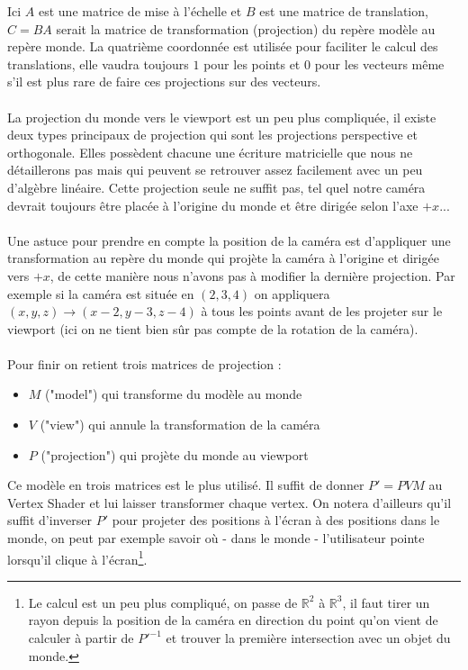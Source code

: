 \documentclass{EPUProjetDi}
\begin{document}
Ici $A$ est une matrice de mise à l'échelle et $B$ est une matrice de translation, $C=BA$ serait la matrice de transformation (projection) du repère modèle au repère monde. La quatrième coordonnée est utilisée pour faciliter le calcul des translations, elle vaudra toujours $1$ pour les points et $0$ pour les vecteurs même s'il est plus rare de faire ces projections sur des vecteurs.


\paragraph{}
La projection du monde vers le viewport est un peu plus compliquée, il existe deux types principaux de projection qui sont les projections perspective et orthogonale. Elles possèdent chacune une écriture matricielle que nous ne détaillerons pas mais qui peuvent se retrouver assez facilement avec un peu d'algèbre linéaire. Cette projection seule ne suffit pas, tel quel notre caméra devrait toujours être placée à l'origine du monde et être dirigée selon l'axe $+x$...
\par


\paragraph{}
Une astuce pour prendre en compte la position de la caméra est d'appliquer une transformation au repère du monde qui projète la caméra à l'origine et dirigée vers $+x$, de cette manière nous n'avons pas à modifier la dernière projection. Par exemple si la caméra est située en $(2,3,4)$ on appliquera $(x,y,z)\rightarrow(x-2,y-3,z-4)$ à tous les points avant de les projeter sur le viewport (ici on ne tient bien sûr pas compte de la rotation de la caméra).

\paragraph{}
Pour finir on retient trois matrices de projection :
\begin{itemize}
	\item{$M$ ("model") qui transforme du modèle au monde}
	\item{$V$ ("view") qui annule la transformation de la caméra}
	\item{$P$ ("projection") qui projète du monde au viewport}
\end{itemize}

Ce modèle en trois matrices est le plus utilisé. Il suffit de donner $P'=PVM$ au Vertex Shader et lui laisser transformer chaque vertex. On notera d'ailleurs qu'il suffit d'inverser $P'$ pour projeter des positions à l'écran à des positions dans le monde, on peut par exemple savoir où - dans le monde - l'utilisateur pointe lorsqu'il clique à l'écran\footnote{Le calcul est un peu plus compliqué, on passe de $\mathbb{R}^2$ à $\mathbb{R}^3$, il faut tirer un rayon depuis la position de la caméra en direction du point qu'on vient de calculer à partir de $P'^{-1}$ et trouver la première intersection avec un objet du monde.}.
\end{document}
